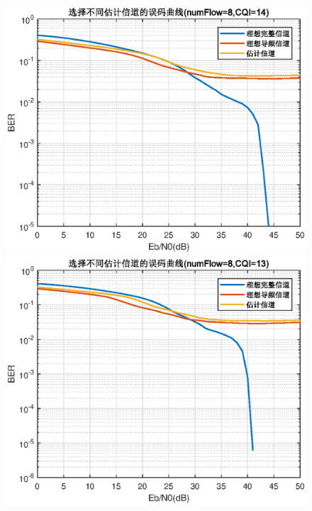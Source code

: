 \documentclass{article}
\begin{document}
\begin{figure}[htbp]
	\centering
	\begin{minipage}[t]{0.48\textwidth}
	\centering
	\includegraphics[width=\textwidth]{plot/plot_CQI14.eps}
	\end{minipage}
	\begin{minipage}[t]{0.48\textwidth}
	\centering
	\includegraphics[width=\textwidth]{plot/plot_CQI13.eps}
	\end{minipage}
\end{figure}
\end{document}
